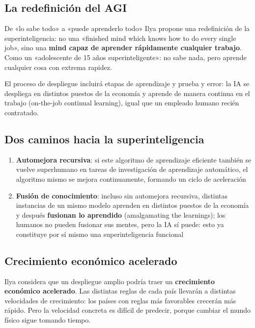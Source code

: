 \documentclass[a4paper]{article}
\begin{document}
\subsection{La redefinición del AGI}

\begin{importantbox}{De «lo sabe todo» a «puede aprenderlo todo»}
Ilya propone una redefinición de la superinteligencia: no una «finished mind which knows how to do every single job», sino una \textbf{mind capaz de aprender rápidamente cualquier trabajo}. Como un «adolescente de 15 años superinteligente»: no sabe nada, pero aprende cualquier cosa con extrema rapidez.
\end{importantbox}

El proceso de despliegue incluirá etapas de aprendizaje y prueba y error: la IA se despliega en distintos puestos de la economía y aprende de manera continua en el trabajo (on-the-job continual learning), igual que un empleado humano recién contratado.

\subsection{Dos caminos hacia la superinteligencia}

\begin{enumerate}
    \item \textbf{Automejora recursiva}: si este algoritmo de aprendizaje eficiente también se vuelve superhumano en tareas de investigación de aprendizaje automático, el algoritmo mismo se mejora continuamente, formando un ciclo de aceleración
    \item \textbf{Fusión de conocimiento}: incluso sin automejora recursiva, distintas instancias de un mismo modelo aprenden en distintos puestos de la economía y después \textbf{fusionan lo aprendido} (amalgamating the learnings); los humanos no pueden fusionar sus mentes, pero la IA sí puede: esto ya constituye por sí mismo una superinteligencia funcional
\end{enumerate}

\subsection{Crecimiento económico acelerado}

Ilya considera que un despliegue amplio podría traer un \textbf{crecimiento económico acelerado}. Las distintas reglas de cada país llevarán a distintas velocidades de crecimiento: los países con reglas más favorables crecerán más rápido. Pero la velocidad concreta es difícil de predecir, porque cambiar el mundo físico sigue tomando tiempo.
\end{document}

